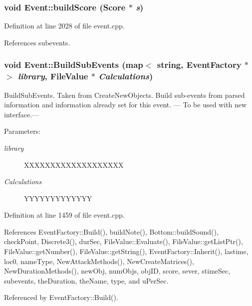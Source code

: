 \subsubsection{\setlength{\rightskip}{0pt plus 5cm}void Event::build\-Score (Score $\ast$ {\em s})\hspace{0.3cm}{\tt  [virtual]}}\label{classEvent_a53}




Definition at line 2028 of file event.cpp.

References subevents.
\subsubsection{\setlength{\rightskip}{0pt plus 5cm}void Event::Build\-Sub\-Events (map$<$ string, {\bf Event\-Factory} $\ast$ $>$ {\em library}, {\bf File\-Value} $\ast$ {\em Calculations})}\label{classEvent_a23}


Build\-Sub\-Events. Taken from Create\-New\-Objects. Build sub-events from parsed information and information already set for this event. --- To be used with new interface.--- \begin{Desc}
\item[Parameters:]
\begin{description}
\item[{\em library}]XXXXXXXXXXXXXXXXXXX \item[{\em Calculations}]YYYYYYYYYYYYY \end{description}
\end{Desc}


Definition at line 1459 of file event.cpp.

References Event\-Factory::Build(), build\-Note(), Bottom::build\-Sound(), check\-Point, Discrete3(), dur\-Sec, File\-Value::Evaluate(), File\-Value::get\-List\-Ptr(), File\-Value::get\-Number(), File\-Value::get\-String(), Event\-Factory::Inherit(), lastime, loc0, name\-Type, New\-Attack\-Methods(), New\-Create\-Matrices(), New\-Duration\-Methods(), new\-Obj, num\-Objs, obj\-ID, score, sever, stime\-Sec, subevents, the\-Duration, the\-Name, type, and u\-Per\-Sec.

Referenced by Event\-Factory::Build().

